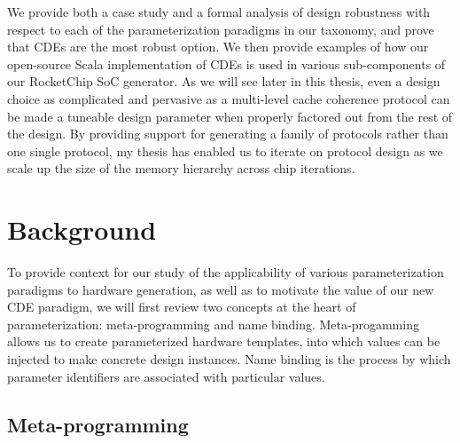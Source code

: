 We provide both a case study and a formal analysis of design robustness with respect to each of the parameterization paradigms in our taxonomy, and prove that CDEs are the most robust option.
We then provide examples of how our open-source Scala implementation of CDEs is used in various sub-components of our RocketChip SoC generator.
As we will see later in this thesis, even a design choice as complicated and pervasive as a multi-level cache coherence protocol can be made a tuneable design parameter when properly factored out from the rest of the design. 
By providing support for generating a family of protocols rather than one single protocol, my thesis has enabled us to iterate on protocol design as we scale up the size of the memory hierarchy across chip iterations.

\section{Background}
\label{sec:rel}


To provide context for our study of the applicability of various parameterization paradigms to hardware generation,
as well as to motivate the value of our new CDE paradigm,
we will first review two concepts at the heart of parameterization:
meta-programming and name binding.
Meta-progamming allows us to create parameterized hardware templates, into which values can be injected to make concrete design instances.
Name binding is the process by which parameter identifiers are associated with particular values.

\subsection{Meta-programming}


